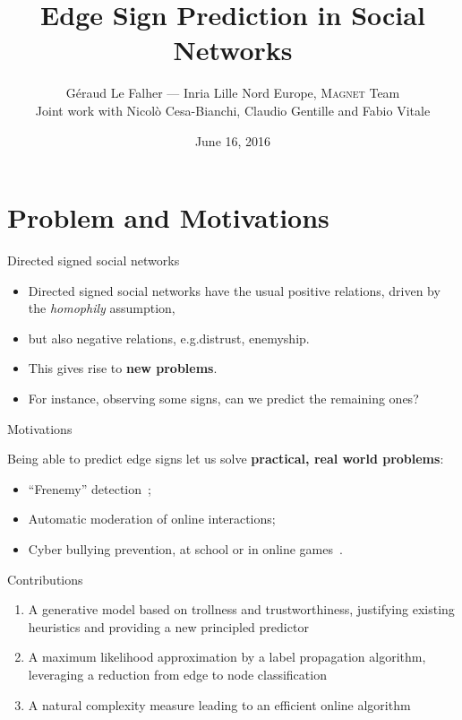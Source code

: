 \documentclass[10pt,svgnames,ignorenonframetext,final]{beamer}
\title{Edge Sign Prediction in Social Networks}
\author{Géraud Le Falher --- Inria Lille Nord Europe, \textsc{Magnet} Team\\
  Joint work with Nicolò Cesa-Bianchi, Claudio Gentille and Fabio Vitale}
\date{June 16, 2016}
\providecommand{\largelist}{%
  \setlength{\itemsep}{8pt}\setlength{\parskip}{3pt}}
\begin{document}
\frame{\titlepage}


\section{Problem and Motivations}\label{introduction}

\begin{frame}{Directed signed social networks}

  \begin{itemize}
    \largelist
    \item
      Directed signed social networks have the usual positive relations,
      driven by the \emph{homophily} assumption,
    \item
      but also \alert{negative relations}, e.g.\@ distrust, enemyship.
    \item
      This gives rise to \textbf{new problems}.
    \item
      For instance, observing some signs, can we predict the remaining ones?
  \end{itemize}

\end{frame}

\begin{frame}{Motivations}

  Being able to predict edge signs let us solve \textbf{practical, real world problems}:

  \begin{itemize}
    \largelist
  \item
    ``Frenemy'' detection~\autocite{frenemy12};
  \item
    Automatic moderation of online interactions;
  \item
    Cyber bullying prevention, at school or in online games~\autocite{CyberbullyingCHI15}.
\end{itemize}

\end{frame}

\begin{frame}{Contributions}

  \begin{enumerate}
    \def\labelenumi{\arabic{enumi}.}
    \largelist
  \item
    A \alert{generative model} based on trollness and trustworthiness, justifying
    existing heuristics and providing a \alert{new principled predictor}
  \item
    A maximum likelihood approximation by a \alert{label propagation algorithm},
    leveraging a reduction from \alert{edge to node classification}
  \item
    A \alert{natural complexity measure} leading to an \alert{efficient online algorithm}
\end{enumerate}

\end{frame}
\end{document}
